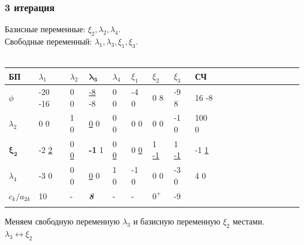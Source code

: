 \documentclass[14pt,a4paper,fleqn]{extarticle}
\begin{document}
\subsubsection*{3 итерация}
Базисные переменные: $\xi_2, \lambda_2, \lambda_4$.\\
Свободные переменный: $\lambda_1, \lambda_3, \xi_1, \xi_3$.\\\\
\begin{tabularx}{\textwidth}{V{1}p{1.2cm}V{1}p{1.2cm}V{1}p{1.2cm}V{7}p{1.1cm}V{7}p{1.2cm}V{1}p{1.2cm}V{1}p{1.2cm}V{1}p{1.2cm}V{1}p{1.5cm}V{1}}
	\hline
	
	БП & $\lambda_1$ & $\lambda_2$ & $\boldsymbol{\lambda_3}$ & $\lambda_4$ & $\xi_1$ & $\xi_2$ & $\xi_3$ & СЧ\\
	
	\hline
	
	$\phi$ & \small -20 \scriptsize -16 & \small 0 \scriptsize 0 & \underline{-8} \scriptsize -8 & \small 0  \scriptsize 0 & -4 \scriptsize 0 & 0 \scriptsize 8 & -9 \scriptsize 8 & \small 16 \scriptsize -8\\
	
	\hline
	
	$\lambda_2$ & \small 0 \scriptsize 0 & \small 1 \scriptsize 0 & \underline{0} \scriptsize 0 & \small 0 \scriptsize 0 & \small 0 \scriptsize 0 & 0 \scriptsize 0 & -1 \scriptsize 0 & \small 100 \scriptsize 0\\
	
	\Xhline{7\arrayrulewidth}
	
	$\boldsymbol{\xi_2}$ & \small -2 \scriptsize \underline{2} & \small 0 \scriptsize \underline{0} & \textbf{-1} \scriptsize 1 & \small 0 \scriptsize \underline{0} & 0 \scriptsize \underline{0} & 1 \scriptsize \underline{-1} & 1 \scriptsize \underline{-1} & \small -1 \scriptsize \underline{1}\\
	
	\Xhline{7\arrayrulewidth}
	
	$\lambda_4$ & \small -3 \scriptsize 0 & \small 0 \scriptsize 0 & \underline{0} \scriptsize 0 & \small 1 \scriptsize 0 & -1 \scriptsize 0 & 0 \scriptsize 0 & \small -3 \scriptsize 0 & \small 4 \scriptsize 0\\
	
	\hdashline
	
	$c_k/a_{2k}$& \small 10 & - & \textit{\textbf{8}} & - & - & \small $0^+$ & -9 &\\
	
	\hdashline
\end{tabularx}
\newline\newline
Меняем свободную переменную $\lambda_3$ и базисную переменную $\xi_2$ местами.\\
$\lambda_3 \leftrightarrow \xi_2$
\newpage
\end{document}
